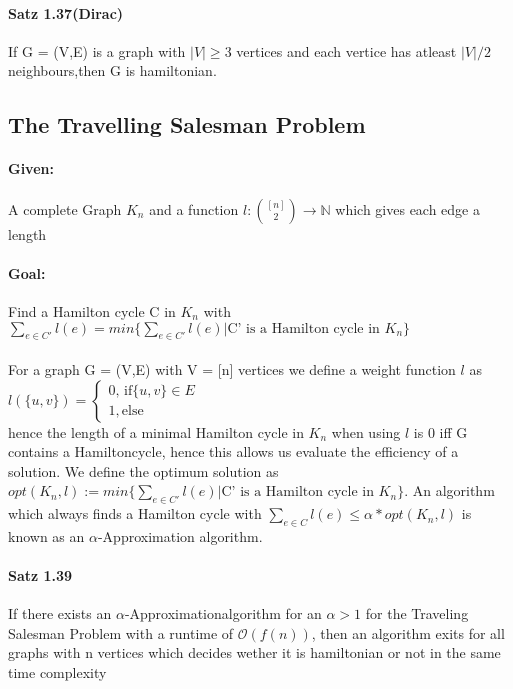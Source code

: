 \documentclass[8pt]{extreport}
\begin{document}
\paragraph{Satz 1.37(Dirac)} If G = (V,E) is a graph with $|V| \geq 3$ vertices and each vertice has atleast $|V|/2$ neighbours,then G is hamiltonian.
\subsection{The Travelling Salesman Problem}
\paragraph{Given:} A complete Graph $K_{n}$ and a function $\mathit{l} : \binom{[n]}{2} \rightarrow \mathbb{N}$ which gives each edge a length
\paragraph{Goal:} Find a Hamilton cycle C in $K_{n}$ with $\sum_{e\in C'} \mathit{l}(e) = min\{\sum_{e\in C'} \mathit{l}(e) | \text{C' is a Hamilton cycle in } K_{n}\}$
\paragraph{} For a graph G = (V,E) with V = [n] vertices we define a weight function $\mathit{l}$ as $\mathit{l}(\{u,v\}) = \begin{cases}  0\text{, if} \{u,v\}\in E\\
1, \text{else} 
\end{cases}
$\\ hence the length of a minimal Hamilton cycle in $K_{n}$ when using $\mathit{l}$ is 0 iff G contains a Hamiltoncycle, hence this allows us evaluate the efficiency of a solution. We define the optimum solution as $opt(K_{n},\mathit{l}) := min\{\sum_{e\in C'} \mathit{l}(e) | \text{C' is a Hamilton cycle in } K_{n}\}$. An algorithm which always finds a Hamilton cycle with $\sum_{e\in C} \mathit{l}(e) \leq \alpha * opt(K_{n},l)$ is known as an $\alpha$-Approximation algorithm.
\paragraph{Satz 1.39} If there exists an $\alpha$-Approximationalgorithm for an $\alpha > 1 $ for the Traveling Salesman Problem with a runtime of $\mathcal{O}(f(n))$, then an algorithm exits for all graphs with n vertices which decides wether it is hamiltonian or not in the same time complexity
\end{document}
